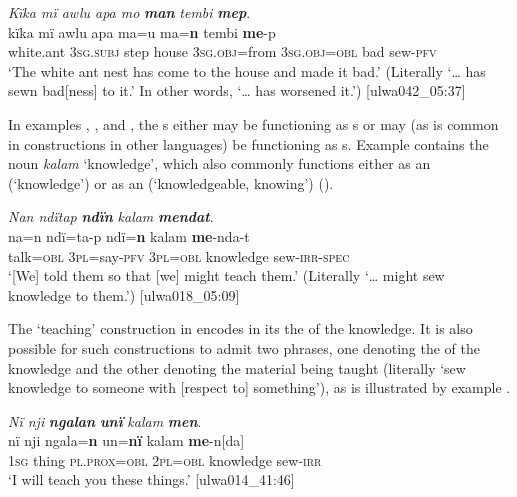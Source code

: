 \ea%
    \label{ex:syntax:362}
          \textit{Kïka mï awlu apa mo} \textbf{\textit{man}} \textit{tembi} \textbf{\textit{mep}}.\\
\gll kïka    mï      awlu  apa    ma=u      ma=\textbf{n} tembi  \textbf{me}{}-p\\
    white.ant  3\textsc{sg.subj}  step  house  3\textsc{sg.obj=}from  3\textsc{sg.obj=obl}           bad    sew-\textsc{pfv}\\
\glt `The white ant nest has come to the house and made it bad.’ (Literally ‘… has sewn bad[ness] to it.’ In other words, ‘… has worsened it.’) [ulwa042\_05:37]
\z

In examples , , and , the s either may be functioning as s or may (as is common in  constructions in other languages) be functioning as s. Example  contains the noun \textit{kalam} ‘knowledge’, which also commonly functions either as an  (‘knowledge’) or as an  (‘knowledgeable, knowing’) ().

\ea%
    \label{ex:syntax:363}
          \textit{Nan ndïtap} \textbf{\textit{ndïn}} \textit{kalam} \textbf{\textit{mendat}}.\\
\gll na=n    ndï=ta-p    ndï=\textbf{n}    kalam      \textbf{me}{}-nda-t\\
    talk=\textsc{obl}  \textsc{3pl=}say-\textsc{pfv}  \textsc{3pl=obl}  knowledge    sew-\textsc{irr-spec}\\
\glt `[We] told them so that [we] might teach them.’ (Literally ‘… might sew knowledge to them.’) [ulwa018\_05:09]
\z

The ‘teaching’ construction in  encodes in its   the  of the knowledge. It is also possible for such constructions to admit two  phrases, one denoting the  of the knowledge and the other denoting the material being taught (literally ‘sew knowledge to someone with [respect to] something’), as is illustrated by example .

\ea%
    \label{ex:syntax:364}
          \textit{Nï nji} \textbf{\textit{ngalan}} \textbf{\textit{unï}} \textit{kalam} \textbf{\textit{men}}.\\
\gll nï    nji    ngala=\textbf{n}    un=\textbf{nï}    kalam    \textbf{me}{}-n[da]\\
    1\textsc{sg}  thing  \textsc{pl.prox=obl}  \textsc{2pl=obl}  knowledge  sew-\textsc{irr}\\
\glt `I will teach you these things.’ [ulwa014\_41:46]
\z

